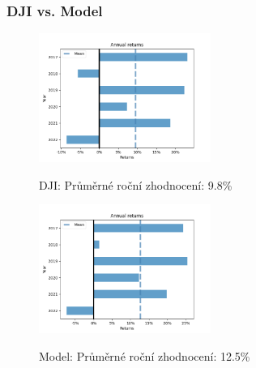 \begin{frame}
    \frametitle{DJI vs. Model}
    \begin{multicols}{2}
        \begin{figure}
            \centering
            \includegraphics[width=0.5\textwidth]{img/annual_returns_dji}

            DJI: Průměrné roční zhodnocení: 9.8\%
        \end{figure}
        \columnbreak
        \begin{figure}
            \centering
            \includegraphics[width=0.5\textwidth]{img/annual_returns_max}

            Model: Průměrné roční zhodnocení: 12.5\%
        \end{figure}
    \end{multicols}
\end{frame}

